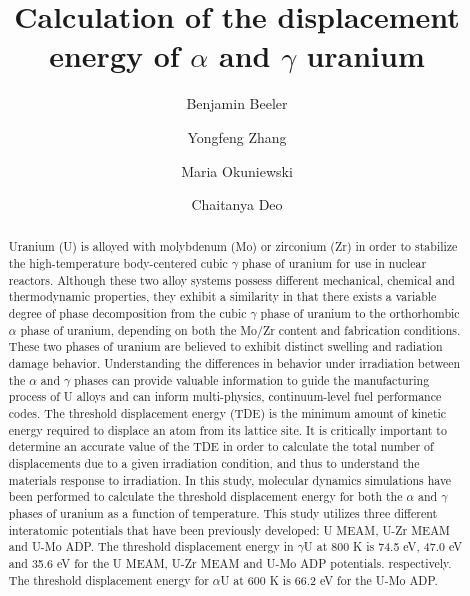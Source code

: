 \documentclass[review]{elsarticle}
\providecommand{\DIFaddtex}[1]{{\protect\color{blue} \sf #1}} %
\providecommand{\DIFaddbegin}{} %
\providecommand{\DIFaddend}{} %
\providecommand{\DIFadd}[1]{\texorpdfstring{\DIFaddtex{#1}}{#1}} %
\newcommand{\DIFaddincludegraphics}[2][]{{\color{blue}\fbox{\DIFOincludegraphics[#1]{#2}}}} %
\DeclareRobustCommand{\DIFaddbegin}{\DIFOaddbegin \let\includegraphics\DIFaddincludegraphics} %
\DeclareRobustCommand{\DIFaddend}{\DIFOaddend \let\includegraphics\DIFOincludegraphics} %
\begin{document}
\begin{frontmatter}
\title{Calculation of the displacement energy of $\alpha$ and $\gamma$ uranium}

\author[inl]{Benjamin Beeler}
\author[inl]{Yongfeng Zhang}
\author[pur]{Maria Okuniewski}
\author[gatech]{Chaitanya Deo}
\address[inl]{Idaho National Laboratory, Idaho Falls, ID 83415}
\address[pur]{Purdue University, West Lafayette, IN 47907}
\address[gatech]{Georgia Institute of Technology, Atlanta, GA 30332}

\begin{abstract}

Uranium (U) is alloyed with molybdenum (Mo) or zirconium (Zr) in order to stabilize the high-temperature body-centered cubic $\gamma$ phase of uranium for use in nuclear reactors. Although these two alloy systems possess different mechanical, chemical and thermodynamic properties, they exhibit a similarity in that there exists a variable degree of phase decomposition from the cubic $\gamma$ phase of uranium to the orthorhombic $\alpha$ phase of uranium, depending on both the Mo/Zr content and fabrication conditions. These two phases of uranium are believed to exhibit distinct swelling and radiation damage behavior. Understanding the differences in behavior under irradiation between the $\alpha$ and $\gamma$ phases can provide valuable information to guide the manufacturing process of U alloys and can inform multi-physics, continuum-level fuel performance codes. The threshold displacement energy (TDE) is the minimum amount of kinetic energy required to displace an atom from its lattice site. It is critically important to determine an accurate value of the TDE in order to calculate the total number of displacements due to a given irradiation condition, and thus to understand the materials response to irradiation. In this study, molecular dynamics simulations have been performed to calculate the \DIFaddbegin \DIFadd{threshold }\DIFaddend displacement energy for both the $\alpha$ and $\gamma$ phases of uranium as a function of temperature. This study utilizes three different interatomic potentials that have been previously developed: U MEAM, U-Zr MEAM and U-Mo ADP. The \DIFaddbegin \DIFadd{threshold }\DIFaddend displacement energy in $\gamma$U at 800 K is 74.5 eV, 47.0 eV and 35.6 eV for the U MEAM, U-Zr MEAM and U-Mo ADP potentials. respectively. The \DIFaddbegin \DIFadd{threshold }\DIFaddend displacement energy for $\alpha$U at 600 K is 66.2 eV for the U-Mo ADP. 
\end{abstract}
\end{frontmatter}
\end{document}
